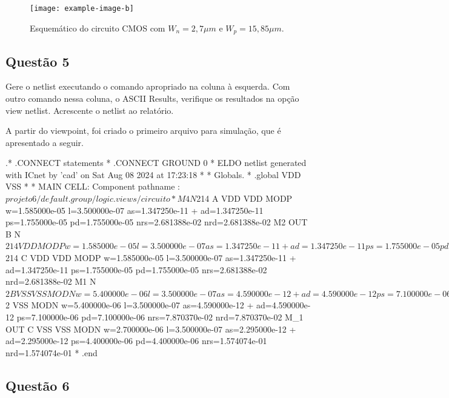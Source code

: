 \documentclass[12pt,a4paper]{article}
\begin{document}
\begin{figure}[H]
    \centering
    \texttt{[image: example-image-b]}
    \caption{Esquemático do circuito CMOS com $W_n = 2,7 \mu m$ e $W_p = 15,85 \mu m$.}
    \label{fig:cmos_schematic}
\end{figure}

\subsection*{Questão 5}

Gere o netlist executando o comando apropriado na coluna à esquerda. Com outro comando nessa coluna, o ASCII Results, verifique os resultados na opção view netlist. Acrescente o netlist ao relatório.

A partir do viewpoint, foi criado o primeiro arquivo para simulação, que é apresentado a seguir.


\begin{codeblock}[title={Exemplo de Netlist}, label={lst:netlist}, listing options={language=TeX}]
.* .CONNECT statements
*
.CONNECT GROUND 0
* ELDO netlist generated with ICnet by 'cad' on Sat Aug 08 2024 at 17:23:18
*
* Globals.
*
.global VDD VSS
*
* MAIN CELL: Component pathname :
$projeto6/default.group/logic.views/circuito
*
M4 N$214 A VDD VDD MODP w=1.585000e-05 l=3.500000e-07
as=1.347250e-11
+ ad=1.347250e-11 ps=1.755000e-05 pd=1.755000e-05 nrs=2.681388e-02
nrd=2.681388e-02
M2 OUT B N$214 VDD MODP w=1.585000e-05 l=3.500000e-07
as=1.347250e-11
+ ad=1.347250e-11 ps=1.755000e-05 pd=1.755000e-05 nrs=2.681388e-02
nrd=2.681388e-02
M3 N$214 C VDD VDD MODP w=1.585000e-05 l=3.500000e-07
as=1.347250e-11
+ ad=1.347250e-11 ps=1.755000e-05 pd=1.755000e-05 nrs=2.681388e-02
nrd=2.681388e-02
M1 N$2 B VSS VSS MODN w=5.400000e-06 l=3.500000e-07 as=4.590000e-12
+ ad=4.590000e-12 ps=7.100000e-06 pd=7.100000e-06 nrs=7.870370e-02
nrd=7.870370e-02
M_2 OUT A N$2 VSS MODN w=5.400000e-06 l=3.500000e-07
as=4.590000e-12
+ ad=4.590000e-12 ps=7.100000e-06 pd=7.100000e-06 nrs=7.870370e-02
nrd=7.870370e-02
M_1 OUT C VSS VSS MODN w=2.700000e-06 l=3.500000e-07
as=2.295000e-12
+ ad=2.295000e-12 ps=4.400000e-06 pd=4.400000e-06 nrs=1.574074e-01
nrd=1.574074e-01
*
.end
\end{codeblock}

\subsection*{Questão 6}
\end{document}
